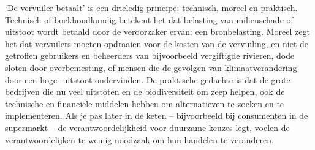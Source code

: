 
`De vervuiler betaalt' is een drieledig principe: technisch, moreel en praktisch. Technisch of boekhoudkundig betekent het dat belasting van milieuschade of uitstoot wordt betaald door de veroorzaker ervan: een bronbelasting. Moreel zegt het dat vervuilers moeten opdraaien voor de kosten van de vervuiling, en niet de getroffen gebruikers en beheerders van bijvoorbeeld vergiftigde rivieren, dode sloten door overbemesting, of mensen die de gevolgen van klimaatverandering door een hoge \COO{}-uitstoot ondervinden. De praktische gedachte is dat de grote bedrijven die nu veel uitstoten en de biodiversiteit om zeep helpen, ook de technische en financiële middelen hebben om alternatieven te zoeken en te implementeren. Als je pas later in de keten – bijvoorbeeld bij consumenten in de supermarkt – de verantwoordelijkheid voor duurzame keuzes legt, voelen de verantwoordelijken te weinig noodzaak om hun handelen te veranderen.
